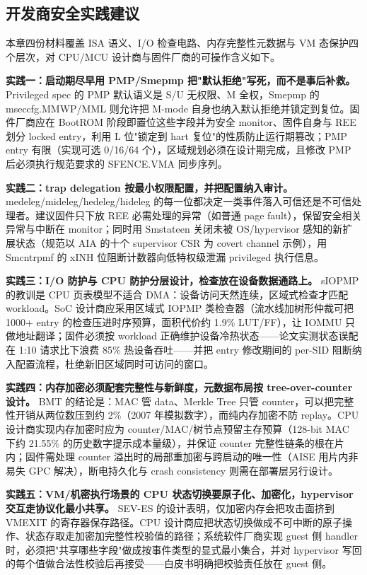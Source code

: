 \documentclass[11pt]{ctexart}
\begin{document}
\subsection{开发商安全实践建议}
本章四份材料覆盖 ISA 语义、I/O 检查电路、内存完整性元数据与 VM 态保护四个层次，对 CPU/MCU 设计商与固件厂商的可操作含义如下。\par
\noindent\textbf{实践一：启动期尽早用 PMP/Smepmp 把"默认拒绝"写死，而不是事后补救。} Privileged spec 的 PMP 默认语义是 S/U 无权限、M 全权，Smepmp 的 mseccfg.MMWP/MML 则允许把 M-mode 自身也纳入默认拒绝并锁定到复位\cite{riscv_privileged}。固件厂商应在 BootROM 阶段即置位这些字段并为安全 monitor、固件自身与 REE 划分 locked entry，利用 L 位"锁定到 hart 复位"的性质防止运行期篡改；PMP entry 有限（实现可选 0/16/64 个），区域规划必须在设计期完成，且修改 PMP 后必须执行规范要求的 SFENCE.VMA 同步序列。\par
\noindent\textbf{实践二：trap delegation 按最小权限配置，并把配置纳入审计。} medeleg/mideleg/hedeleg/hideleg 的每一位都决定一类事件落入可信还是不可信处理者\cite{riscv_privileged}。建议固件只下放 REE 必需处理的异常（如普通 page fault），保留安全相关异常与中断在 monitor；同时用 Smstateen 关闭未被 OS/hypervisor 感知的新扩展状态（规范以 AIA 的十个 supervisor CSR 为 covert channel 示例），用 Smcntrpmf 的 xINH 位阻断计数器向低特权级泄漏 privileged 执行信息。\par
\noindent\textbf{实践三：I/O 防护与 CPU 防护分层设计，检查放在设备数据通路上。} sIOPMP 的教训是 CPU 页表模型不适合 DMA：设备访问天然连续，区域式检查才匹配 workload\cite{feng2024siopmp}。SoC 设计商应采用区域式 IOPMP 类检查器（流水线加树形仲裁可把 1000+ entry 的检查压进时序预算，面积代价约 1.9\% LUT/FF），让 IOMMU 只做地址翻译；固件必须按 workload 正确维护设备冷热状态——论文实测状态误配在 1:10 请求比下浪费 85\% 热设备吞吐——并把 entry 修改期间的 per-SID 阻断纳入配置流程，杜绝新旧区域同时可访问的窗口。\par
\noindent\textbf{实践四：内存加密必须配套完整性与新鲜度，元数据布局按 tree-over-counter 设计。} BMT 的结论是：MAC 管 data、Merkle Tree 只管 counter，可以把完整性开销从两位数压到约 2\%（2007 年模拟数字），而纯内存加密不防 replay\cite{rogers2007bonsai}。CPU 设计商实现内存加密时应为 counter/MAC/树节点预留主存预算（128-bit MAC 下约 21.55\% 的历史数字提示成本量级），并保证 counter 完整性链条的根在片内；固件需处理 counter 溢出时的局部重加密与跨启动的唯一性（AISE 用片内非易失 GPC 解决），断电持久化与 crash consistency 则需在部署层另行设计。\par
\noindent\textbf{实践五：VM/机密执行场景的 CPU 状态切换要原子化、加密化，hypervisor 交互走协议化最小共享。} SEV-ES 的设计表明，仅加密内存会把攻击面挤到 VMEXIT 的寄存器保存路径\cite{amd_sev_snp}。CPU 设计商应把状态切换做成不可中断的原子操作、状态存取走加密加完整性校验值的路径；系统软件厂商实现 guest 侧 handler 时，必须把"共享哪些字段"做成按事件类型的显式最小集合，并对 hypervisor 写回的每个值做合法性校验后再接受——白皮书明确把校验责任放在 guest 侧。\par
\end{document}
